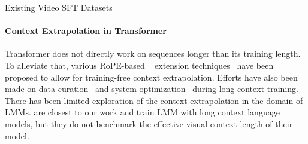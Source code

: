 \begin{table}[t]
\centering
\begin{minipage}{0.45\textwidth}
\centering
\caption{Existing Video SFT Datasets}
\label{table:it_dataset_info}
\end{minipage}
\hfill
\begin{minipage}{0.45\textwidth}
\centering
\caption{ Video Benchmarks}
\label{table:existing_benchmarks}
\end{minipage}
\end{table}
 
\paragraph{Context Extrapolation in Transformer}
Transformer does not directly work on sequences longer than its training length. To alleviate that, various RoPE-based ~\citep{su2023roformer} extension techniques~\citep{chen2023extending,NTK-aware, rozière2024code,peng2023yarn,ding2024longrope} have been proposed to allow for training-free context extrapolation. Efforts have also been made on data curation~\citep{fu2024data,xiong2023effective,bai2024longalign} and system optimization~\citep{li-etal-2023-sequence,liu2023ring,jacobs2023deepspeed} during long context training. There has been limited exploration of the context extrapolation in the domain of LMMs. \cite{liu2023world} are closest to our work and train LMM with long context language models, but they do not benchmark the effective visual context length of their model.

